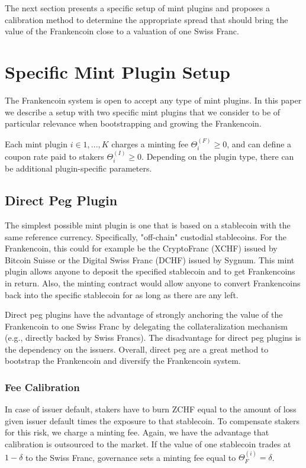 \documentclass[english,11pt]{article}
\begin{document}
The next section presents a specific setup of mint plugins and proposes
a calibration method to determine the appropriate spread that should
bring the value of the Frankencoin close to a valuation of one Swiss Franc. 

\section{Specific Mint Plugin Setup}
The Frankencoin system is open to accept any type of mint plugins. 
In this paper we describe a setup with two specific mint plugins that 
we consider to be of particular relevance when bootstrapping and growing the Frankencoin.

Each mint plugin $i \in 1,...,K$ charges a minting fee $\Theta_{i}^{(F)} \geq 0$, and can define
a coupon rate paid to stakers $\Theta_i^{(I)} \geq 0$. Depending on the plugin type,
there can be additional plugin-specific parameters.

\subsection{Direct Peg Plugin}
The simplest possible mint plugin is one that is based on a stablecoin with the same reference currency. Specifically, "off-chain" custodial stablecoins. For the Frankencoin, this could for example be the CryptoFranc (XCHF) issued by Bitcoin Suisse or the Digital Swiss Franc (DCHF) issued by Sygnum. 
This mint plugin allows anyone to deposit the specified stablecoin and to get Frankencoins in return. Also, the minting contract would allow anyone to convert Frankencoins back into the specific stablecoin for as long as there are any left.

Direct peg plugins have the advantage of strongly anchoring the value of the Frankencoin to one Swiss Franc by delegating the collateralization mechanism
(e.g., directly backed by Swiss Francs).  
The disadvantage for direct peg plugins is the dependency on 
the issuers. Overall, direct peg are a great method to bootstrap 
the Frankencoin and diversify the Frankencoin system.

\subsubsection{Fee Calibration}
In case of issuer default, stakers have to burn ZCHF equal to the amount of
loss given issuer default times the exposure to that stablecoin. 
To compensate stakers for this risk,
we charge a minting fee. Again, we have the advantage that 
calibration is outsourced to the market.
If the value of one stablecoin trades at $1-\delta$ to the Swiss Franc, governance
sets a minting fee equal to $\Theta_F^{(i)} = \delta$.
\end{document}

